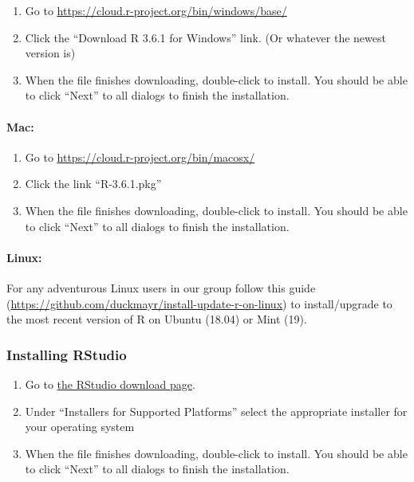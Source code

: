\documentclass[
]{article}
\providecommand{\tightlist}{%
  \setlength{\itemsep}{0pt}\setlength{\parskip}{0pt}}
\begin{document}
\begin{enumerate}
\def\labelenumi{\arabic{enumi}.}
\tightlist
\item
  Go to \url{https://cloud.r-project.org/bin/windows/base/}
\item
  Click the ``Download R 3.6.1 for Windows'' link. (Or whatever the
  newest version is)
\item
  When the file finishes downloading, double-click to install. You
  should be able to click ``Next'' to all dialogs to finish the
  installation.
\end{enumerate}

\hypertarget{mac}{%
\paragraph{Mac:}\label{mac}}

\begin{enumerate}
\def\labelenumi{\arabic{enumi}.}
\tightlist
\item
  Go to \url{https://cloud.r-project.org/bin/macosx/}
\item
  Click the link ``R-3.6.1.pkg''
\item
  When the file finishes downloading, double-click to install. You
  should be able to click ``Next'' to all dialogs to finish the
  installation.
\end{enumerate}

\hypertarget{linux}{%
\paragraph{Linux:}\label{linux}}

For any adventurous Linux users in our group follow this guide
(\url{https://github.com/duckmayr/install-update-r-on-linux}) to
install/upgrade to the most recent version of R on Ubuntu (18.04) or
Mint (19).

\hypertarget{installing-rstudio}{%
\subsubsection{Installing RStudio}\label{installing-rstudio}}

\begin{enumerate}
\def\labelenumi{\arabic{enumi}.}
\tightlist
\item
  Go to
  \href{https://www.rstudio.com/products/rstudio/download/\#download}{the
  RStudio download page}.
\item
  Under ``Installers for Supported Platforms'' select the appropriate
  installer for your operating system
\item
  When the file finishes downloading, double-click to install. You
  should be able to click ``Next'' to all dialogs to finish the
  installation.
\end{enumerate}
\end{document}
